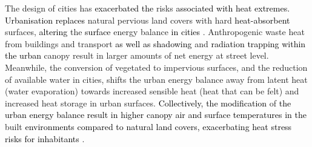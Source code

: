 \documentclass[final,3p,times,authoryear]{elsarticle}
\newcommand{\add}[1]{\textcolor{black}{#1}}
\newcommand{\remove}[1]{\textcolor{red}{\st{}}}
\begin{document}
The design of cities has \remove{enhanced these}\add{exacerbated the} risks \remove{by replacing}\add{associated with heat extremes. Urbanisation replaces} natural pervious land covers with hard \remove{heat absorbent}\add{heat-absorbent} surfaces, \remove{resulting in increased heat stress for inhabitants. This urbanisation of land-use has altered}\add{altering} the \remove{urban}\add{surface} energy balance \add{in cities} \citep{Oke1982}. Anthropogenic waste heat from buildings and transport \add{as well as shadowing} and \remove{reduced shading through diminishing tree}\add{radiation trapping within the urban} canopy \remove{cover}result in larger amounts of net energy at street level. Meanwhile, the conversion of vegetated to impervious surfaces, and the reduction of available water in cities, shifts the urban energy balance away from latent heat (water evaporation) towards increased sensible heat (heat that can be felt) and increased heat storage in urban surfaces. \remove{Mitigation strategies that incorporate findings from urban climate research into planning}\add{Collectively, the modification} of \remove{future developments can ensure that newly}\add{the urban energy balance result in higher canopy air and surface temperatures in the} built \remove{areas}\add{environments compared to natural land covers, exacerbating heat stress risks for inhabitants} \citep{Coutts2012,Martilli2020}. 
\end{document}
